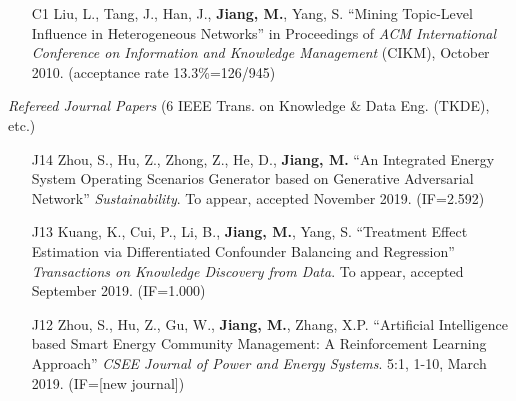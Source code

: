 \documentclass[10pt]{article}
\newenvironment{myindentpar}[1]%
{\begin{list}{}%
         {\setlength{\leftmargin}{#1}}%
         \item[]%
}
{\end{list}}
\newcounter{list}
\newcommand{\hide}[1]{}
\begin{document}
\begin{myindentpar}{0.00cm}
\begin{enumerate}[leftmargin=.5cm]
	\hide{\vspace{-0.1cm}\hspace{0.5cm}{\small \emph{I conceived the idea in consultation with Dr. Cui. I designed the study, completed the experiments, and wrote the paper. Dr. Cui edited the paper.}}}

\item[C1] Liu, L., Tang, J., Han, J., \textbf{Jiang, M.}, Yang, S. ``Mining Topic-Level Influence in Heterogeneous Networks'' in Proceedings of \emph{ACM International Conference on Information and Knowledge Management} (CIKM), October 2010. (acceptance rate 13.3\%=126/945)

	\hide{\vspace{-0.1cm}\hspace{0.5cm}{\small \emph{Ms. Liu conceived the idea in consultation with myself. Ms. Liu and I implemented the system and completed the experiments.}}}

\end{enumerate}

\hspace{-0.25cm}\emph{Refereed Journal Papers} {\small (6 IEEE Trans. on Knowledge \& Data Eng. (TKDE), etc.)}

\begin{enumerate}[leftmargin=.5cm]

\item[J14] Zhou, S., Hu, Z., Zhong, Z., He, D., \textbf{Jiang, M.} ``An Integrated Energy System Operating Scenarios Generator based on Generative Adversarial Network'' \textit{Sustainability}. To appear, accepted November 2019. (IF=2.592)
		
\item[J13] Kuang, K., Cui, P., Li, B., \textbf{Jiang, M.}, Yang, S. ``Treatment Effect Estimation via Differentiated Confounder Balancing and Regression'' \textit{Transactions on Knowledge Discovery from Data}. To appear, accepted September 2019. (IF=1.000)

	\hide{\vspace{-0.1cm}\hspace{0.5cm}{\small \emph{Mr. Kuang conceived the idea in consultation with myself. Mr. Kuang implemented the system and completed the experiments. Mr. Kuang wrote the paper.}}}

\item[J12] Zhou, S., Hu, Z., Gu, W., \textbf{Jiang, M.}, Zhang, X.P. ``Artificial Intelligence based Smart Energy Community Management: A Reinforcement Learning Approach'' \textit{CSEE Journal of Power and Energy Systems}. 5:1, 1-10, March 2019. (IF=[new journal])


\end{enumerate}
\end{myindentpar}
\end{document}
